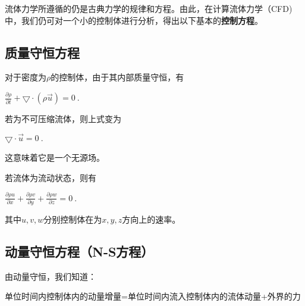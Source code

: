 
\begin{issues}
\issueDraft
\end{issues}


流体力学所遵循的仍是古典力学的规律和方程。由此，在计算流体力学（CFD)中，我们仍可对一个小的控制体进行分析，得出以下基本的\textbf{控制方程}。

\subsection{质量守恒方程}
对于密度为$\rho$的控制体，由于其内部质量守恒，有

$\frac{\partial \rho }{\partial t}+\bigtriangledown \cdot (\rho \overrightarrow{u})=0~.$

若为不可压缩流体，则上式变为

$\bigtriangledown \cdot \overrightarrow{u} =0~.$

这意味着它是一个无源场。

若流体为流动状态，则有

$\frac{\partial \rho u}{\partial x}+\frac{\partial \rho v}{\partial y}+\frac{\partial \rho w}{\partial z}=0~.$

其中$u,v,w$分别控制体在为$x,y,z$方向上的速率。


\subsection{动量守恒方程（N-S方程）}
由动量守恒，我们知道：

单位时间内控制体内的动量增量=单位时间内流入控制体内的流体动量+外界的力
